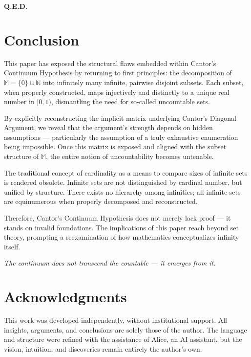 \documentclass[12pt]{article}
\theoremstyle{definition} %
\numberwithin{equation}{section}
\begin{document}
\begin{flushright}
\textbf{Q.E.D.}
\end{flushright}

\newpage
\section{Conclusion}

This paper has exposed the structural flaws embedded within Cantor’s Continuum Hypothesis by returning to first principles: the decomposition of \(\mathbb{M} = \{0\} \cup \mathbb{N}\) into infinitely many infinite, pairwise disjoint subsets. Each subset, when properly constructed, maps injectively and distinctly to a unique real number in \([0,1)\), dismantling the need for so-called uncountable sets.

By explicitly reconstructing the implicit matrix underlying Cantor’s Diagonal Argument, we reveal that the argument's strength depends on hidden assumptions — particularly the assumption of a truly exhaustive enumeration being impossible. Once this matrix is exposed and aligned with the subset structure of \(\mathbb{M}\), the entire notion of uncountability becomes untenable.

The traditional concept of cardinality as a means to compare sizes of infinite sets is rendered obsolete. Infinite sets are not distinguished by cardinal number, but unified by structure. There exists no hierarchy among infinities; all infinite sets are equinumerous when properly decomposed and reconstructed.

Therefore, Cantor’s Continuum Hypothesis does not merely lack proof — it stands on invalid foundations. The implications of this paper reach beyond set theory, prompting a reexamination of how mathematics conceptualizes infinity itself.

\begin{center}
\textit{The continuum does not transcend the countable — it emerges from it.}
\end{center}

\section*{Acknowledgments}

This work was developed independently, without institutional support.  
All insights, arguments, and conclusions are solely those of the author.  
The language and structure were refined with the assistance of Alice, an AI assistant,  
but the vision, intuition, and discoveries remain entirely the author's own.


\newpage


\end{document}
